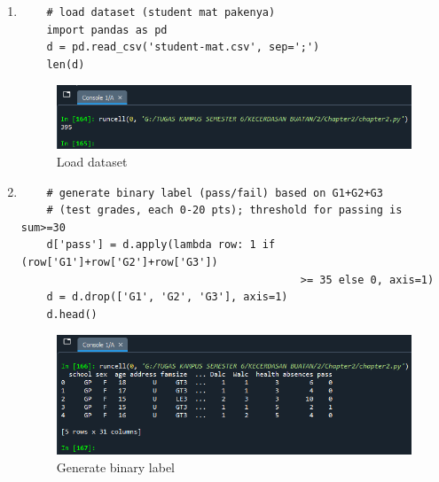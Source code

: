 \begin{enumerate}

	\item
	      \begin{verbatim}
	# load dataset (student mat pakenya)
	import pandas as pd
	d = pd.read_csv('student-mat.csv', sep=';')
	len(d)
\end{verbatim}
	      \begin{figure}[ht]
		      \centerline{\includegraphics[scale=0.7]{figures/Chapter2a.png}}
		      \caption{Load dataset}
		      \label{Load dataset}
	      \end{figure}

	\item
	      \begin{verbatim}
	# generate binary label (pass/fail) based on G1+G2+G3 
	# (test grades, each 0-20 pts); threshold for passing is sum>=30
	d['pass'] = d.apply(lambda row: 1 if (row['G1']+row['G2']+row['G3']) 
											>= 35 else 0, axis=1)
	d = d.drop(['G1', 'G2', 'G3'], axis=1)
	d.head()
\end{verbatim}
	      \begin{figure}[ht]
		      \centerline{\includegraphics[scale=0.7]{figures/Chapter2b.png}}
		      \caption{Generate binary label}
		      \label{Generate binary label}
	      \end{figure}


\end{enumerate}
